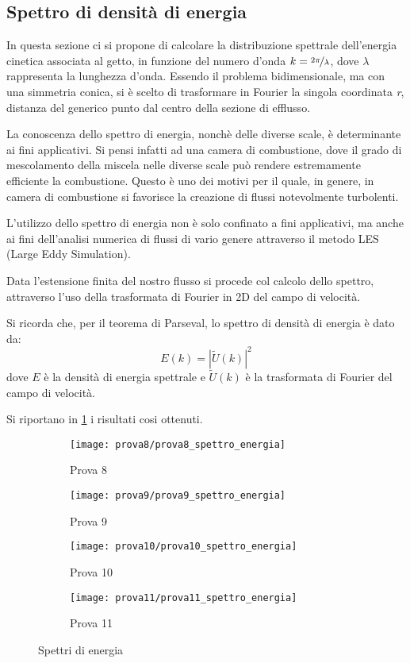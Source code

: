 \documentclass{article} %
\begin{document}
\subsection{Spettro di densità di energia}
In questa sezione ci si propone di calcolare la distribuzione spettrale dell'energia cinetica associata al getto, in funzione del numero d'onda $k=\nicefrac{2\pi}{\lambda}$, dove $\lambda$ rappresenta la lunghezza d'onda. Essendo il problema bidimensionale, ma con una simmetria conica, si è scelto di trasformare in Fourier la singola coordinata \textit{r}, distanza del generico punto dal centro della sezione di efflusso.\par
La conoscenza dello spettro di energia, nonchè delle diverse scale, è determinante ai fini applicativi. Si pensi infatti ad una camera di combustione, dove il grado di mescolamento della miscela nelle diverse scale può rendere estremamente efficiente la combustione. Questo è uno dei motivi per il quale, in genere, in camera di combustione si favorisce la creazione di flussi notevolmente turbolenti.\par
L'utilizzo dello spettro di energia non è solo confinato a fini applicativi, ma anche ai fini dell'analisi numerica di flussi di vario genere attraverso il metodo LES (Large Eddy Simulation).\par
Data l'estensione finita del nostro flusso si procede col calcolo dello spettro, attraverso l'uso della trasformata di Fourier in 2D del campo di velocità.\par
Si ricorda che, per il teorema di Parseval, lo spettro di densità di energia è dato da:
$$E(k)=|\tilde{U}(k)|^{2}$$
dove $E$ è la densità di energia spettrale e $\tilde{U}(k)$ è la trasformata di Fourier del campo di velocità.\par
Si riportano in \cref{fig:spettro_energia_8901} i risultati cosi ottenuti. 
\begin{figure}[h!]
	\centering
	\begin{subfigure}[b]{0.24\textwidth}
		\texttt{[image: prova8/prova8\_spettro\_energia]}
		\caption{Prova 8}
	\end{subfigure}
	\begin{subfigure}[b]{0.24\textwidth}
		\texttt{[image: prova9/prova9\_spettro\_energia]}
			\caption{Prova 9}
	\end{subfigure}
	\begin{subfigure}[b]{0.24\textwidth}
		\texttt{[image: prova10/prova10\_spettro\_energia]}
		\caption{Prova 10}
	\end{subfigure}
	\begin{subfigure}[b]{0.24\textwidth}
		\texttt{[image: prova11/prova11\_spettro\_energia]}
		\caption{Prova 11}
	\end{subfigure}
	\caption{Spettri di energia}
	\label{fig:spettro_energia_8901}
\end{figure}\par
\end{document}
